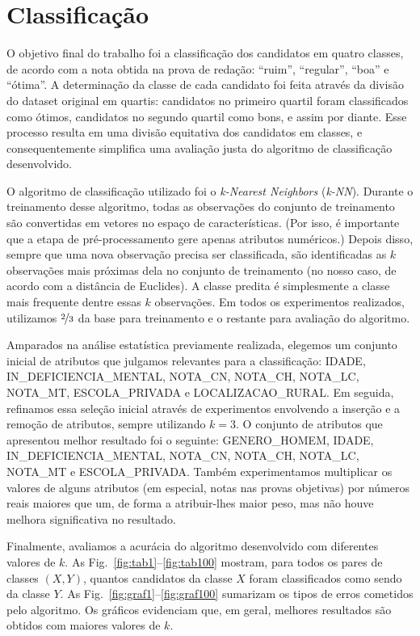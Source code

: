 \documentclass[12pt]{article}
\begin{document}
\section{Classificação}
\label{sec:classificacao}
O objetivo final do trabalho foi a classificação dos candidatos em quatro classes, de acordo com a nota obtida na prova de redação: ``ruim'', ``regular'', ``boa'' e ``ótima''.
A determinação da classe de cada candidato foi feita através da divisão do dataset original em quartis: candidatos no primeiro quartil foram classificados como ótimos, candidatos no segundo quartil como bons, e assim por diante.
Esse processo resulta em uma divisão equitativa dos candidatos em classes, e consequentemente simplifica uma avaliação justa do algoritmo de classificação desenvolvido.

O algoritmo de classificação utilizado foi o \emph{k-Nearest Neighbors} (\emph{k-NN}).
Durante o treinamento desse algoritmo, todas as observações do conjunto de treinamento são convertidas em vetores no espaço de características.
(Por isso, é importante que a etapa de pré-processamento gere apenas atributos numéricos.)
Depois disso, sempre que uma nova observação precisa ser classificada, são identificadas as $k$ observações mais próximas dela no conjunto de treinamento (no nosso caso, de acordo com a distância de Euclides).
A classe predita é simplesmente a classe mais frequente dentre essas $k$ observações.
Em todos os experimentos realizados, utilizamos $\nicefrac{2}{3}$ da base para treinamento e o restante para avaliação do algoritmo.

Amparados na análise estatística previamente realizada, elegemos um conjunto inicial de atributos que julgamos relevantes para a classificação: IDADE, IN\_DEFICIENCIA\_MENTAL, NOTA\_CN, NOTA\_CH, NOTA\_LC, NOTA\_MT, ESCOLA\_PRIVADA e LOCALIZACAO\_RURAL.
Em seguida, refinamos essa seleção inicial através de experimentos envolvendo a inserção e a remoção de atributos, sempre utilizando $k=3$.
O conjunto de atributos que apresentou melhor resultado foi o seguinte: GENERO\_HOMEM, IDADE, IN\_DEFICIENCIA\_MENTAL, NOTA\_CN, NOTA\_CH, NOTA\_LC, NOTA\_MT e ESCOLA\_PRIVADA.
Também experimentamos multiplicar os valores de alguns atributos (em especial, notas nas provas objetivas) por números reais maiores que um, de forma a atribuir-lhes maior peso, mas não houve melhora significativa no resultado.

Finalmente, avaliamos a acurácia do algoritmo desenvolvido com diferentes valores de $k$.
As Fig.~\ref{fig:tab1}--\ref{fig:tab100} mostram, para todos os pares de classes $(X, Y)$, quantos candidatos da classe $X$ foram classificados como sendo da classe $Y$.
As Fig.~\ref{fig:graf1}--\ref{fig:graf100} sumarizam os tipos de erros cometidos pelo algoritmo.
Os gráficos evidenciam que, em geral, melhores resultados são obtidos com maiores valores de $k$.
\end{document}
